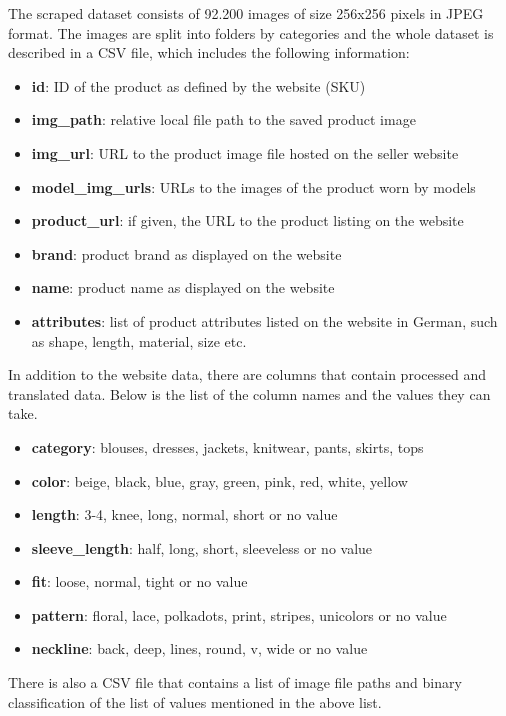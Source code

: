 \documentclass{article}
\begin{document}
The scraped dataset consists of 92.200 images of size 256x256 pixels in JPEG format. The images are split into folders by categories and the whole dataset is described in a CSV file, which includes the following information:
\pagebreak
\begin{itemize}
\item \textbf{id}: ID of the product as defined by the website (SKU)
\item \textbf{img\_path}: relative local file path to the saved product image
\item \textbf{img\_url}: URL to the product image file hosted on the seller website
\item \textbf{model\_img\_urls}: URLs to the images of the product worn by models
\item \textbf{product\_url}: if given, the URL to the product listing on the website
\item \textbf{brand}: product brand as displayed on the website
\item \textbf{name}: product name as displayed on the website
\item \textbf{attributes}: list of product attributes listed on the website in German, such as shape, length, material, size etc.
\end{itemize}

In addition to the website data, there are columns that contain processed and translated data. Below is the list of the column names and the values they can take.
\begin{itemize}
\item \textbf{category}: blouses, dresses, jackets, knitwear, pants, skirts, tops
\item \textbf{color}: beige, black, blue, gray, green, pink, red, white, yellow
\item \textbf{length}: 3-4, knee, long, normal, short or no value
\item \textbf{sleeve\_length}: half, long, short, sleeveless or no value
\item \textbf{fit}: loose, normal, tight or no value
\item \textbf{pattern}: floral, lace, polkadots, print, stripes, unicolors or no value
\item \textbf{neckline}: back, deep, lines, round, v, wide or no value
\end{itemize}

There is also a CSV file that contains a list of image file paths and binary classification of the list of values mentioned in the above list.
\end{document}
